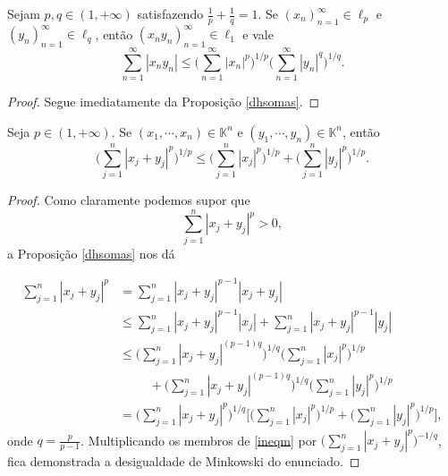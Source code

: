 \begin{corollary}
    Sejam $p,q \in (1,+\infty)$ satisfazendo $\frac{1}{p} + \frac{1}{q} =1$. Se $(x_n)_{n=1}^{\infty} \in \ell _p$ e $(y_n)_{n=1}^{\infty} \in \ell _q$, então $(x_n y_n)_{n=1}^{\infty} \in \ell _1$ e vale
    \[
    \displaystyle \sum_{n=1}^{\infty} |x_n y_n|\leq \bigg( \sum_{n=1}^{\infty} |x_n|^p \bigg)^{1/p} \bigg( \sum_{n=1}^{\infty} |y_n|^q \bigg)^{1/q} .
    \]
\end{corollary}
\begin{proof}
Segue imediatamente da Proposição \ref{dhsomas}.
\end{proof}


\begin{proposition}
Seja $p\in (1,+\infty)$. Se $(x_1, \cdots , x_n) \in \mathbb K^n$ e $(y_1, \cdots , y_n) \in \mathbb K^n$, então 
    \[
    \displaystyle \bigg( \sum_{j=1}^{n} |x_j + y_j|^p \bigg)^{1/p} \leq \bigg( \sum_{j=1}^{n} |x_j|^p \bigg)^{1/p} +\bigg( \sum_{j=1}^{n} |y_j|^p \bigg)^{1/p} .
    \]
\end{proposition}

\begin{proof}
Como claramente podemos supor que
\[
\displaystyle \sum_{j=1}^{n} |x_j + y_j|^p >0,
\]
a Proposição \ref{dhsomas} nos dá

\begin{align}
\displaystyle \sum_{j=1}^{n} |x_j + y_j|^p
&=\sum_{j=1}^{n} |x_j + y_j|^{p-1} |x_j + y_j| \nonumber \\
&\leq \sum_{j=1}^{n} |x_j + y_j|^{p-1} |x_j|
+\sum_{j=1}^{n} |x_j + y_j|^{p-1} |y_j| \nonumber \\
&\leq \bigg( \sum_{j=1}^{n} |x_j + y_j|^{(p-1)q} \bigg)^{1/q} \bigg( \sum_{j=1}^{n} |x_j|^p \bigg)^{1/p} \nonumber\\
&\hspace{1cm}+\bigg( \sum_{j=1}^{n} |x_j + y_j|^{(p-1)q} \bigg)^{1/q} \bigg( \sum_{j=1}^{n} |y_j|^p \bigg)^{1/p} \nonumber \\
&=\bigg( \sum_{j=1}^{n} |x_j + y_j|^{p} \bigg)^{1/q} \bigg[ \bigg( \sum_{j=1}^{n} |x_j|^p \bigg)^{1/p} + \bigg( \sum_{j=1}^{n} |y_j|^p \bigg)^{1/p}\bigg] \label{ineqm},
\end{align}
onde $q=\frac{p}{p-1}$. Multiplicando os membros de \eqref{ineqm} por $\bigg( \sum_{j=1}^{n} |x_j + y_j|^p \bigg)^{-1/q}$, fica demonstrada a desigualdade de Minkowski do enunciado.
\end{proof}

